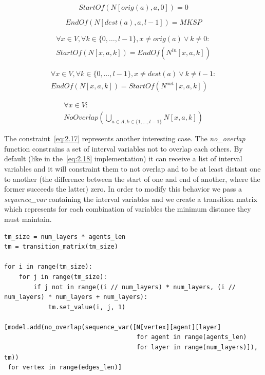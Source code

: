 \documentclass[12pt, a4paper, hidelinks]{article}
\numberwithin{equation}{section}
\begin{document}
\begin{description}
\item \begin{equation} StartOf(N[orig(a),a,0]) = 0 \label{eq:2.13}\end{equation}
\item \begin{equation} EndOf(N[dest(a),a,l-1]) = MKSP \label{eq:2.14}\end{equation}
\item \begin{equation}\begin{split} \forall x \in V, \forall k \in \{0,\dots,l-1\}, x \neq orig(a) \lor k \neq 0: \\ StartOf(N[x,a,k]) = EndOf(N^{in}[x,a,k]) \end{split}\label{eq:2.15}\end{equation}
\item \begin{equation}\begin{split} \forall x \in V, \forall k \in \{0,\dots,l-1\}, x \neq dest(a) \lor k \neq l-1: \\ EndOf(N[x,a,k]) = StartOf(N^{out}[x,a,k]) \end{split}\label{eq:2.16}\end{equation}
\item \begin{equation}\begin{split} \forall x \in V: \\ NoOverlap(\bigcup_{a \in A, k \in \{1,\dots,l-1\}} N[x,a,k])\end{split}\label{eq:2.17}\end{equation}
\end{description}

The constraint~\ref{eq:2.17} represents another interesting case.
The \textit{no\_overlap} function constrains a set of interval variables not to overlap each others.
By default (like in the~\ref{eq:2.18} implementation) it can receive a list of interval variables and it will constraint them to not overlap and to be at least distant one to another (the difference between the start of one and end of another, where the former succeeds the latter) zero.
In order to modify this behavior we pass a \textit{sequence\_var} containing the interval variables and we create a transition matrix which represents for each combination of variables the minimum distance they must maintain.

\begin{lstlisting}[label={lst:minimize2}]
tm_size = num_layers * agents_len
tm = transition_matrix(tm_size)

for i in range(tm_size):
    for j in range(tm_size):
        if j not in range((i // num_layers) * num_layers, (i // num_layers) * num_layers + num_layers):
            tm.set_value(i, j, 1)

[model.add(no_overlap(sequence_var([N[vertex][agent][layer]
                                    for agent in range(agents_len)
                                    for layer in range(num_layers)]), tm))
 for vertex in range(edges_len)]
\end{lstlisting}
\end{document}
